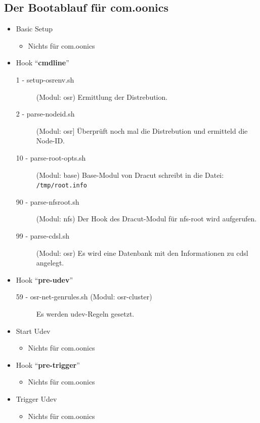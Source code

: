 \documentclass[10pt,a4paper]{article}
\begin{document}
\subsection{Der Bootablauf für com.oonics}


\begin{itemize}
 \item Basic Setup
    \begin{itemize}
      \item Nichts für com.oonics
    \end{itemize}
 \item Hook "`\textbf{cmdline}"'
    \begin{description}
      \item [1 - setup-osrenv.sh] (Modul: osr) Ermittlung der Distrebution.
      \item [2 - parse-nodeid.sh] (Modul: osr] Überprüft noch mal die
      Distrebution und ermitteld die Node-ID.
      \item [10 - parse-root-opts.sh] (Modul: base) Base-Modul von Dracut
      schreibt in die Datei: \texttt{/tmp/root.info}
      \item [90 - parse-nfsroot.sh] (Modul: nfs) Der Hook des Dracut-Modul für
      nfs-root wird aufgerufen.
      \item [99 - parse-cdsl.sh] (Modul: osr) Es wird eine Datenbank mit den
      Informationen zu cdsl angelegt.
    \end{description}
 \item Hook "`\textbf{pre-udev}"'
    \begin{description}
      \item [59 - osr-net-genrules.sh (Modul: osr-cluster)] Es werden
      udev-Regeln gesetzt.
    \end{description}
 \item Start Udev
    \begin{itemize}
      \item Nichts für com.oonics
    \end{itemize}
 \item Hook "`\textbf{pre-trigger}"'
    \begin{itemize}
      \item Nichts für com.oonics
    \end{itemize}
 \item Trigger Udev
    \begin{itemize}
      \item Nichts für com.oonics
    \end{itemize}

\end{itemize}
\end{document}
